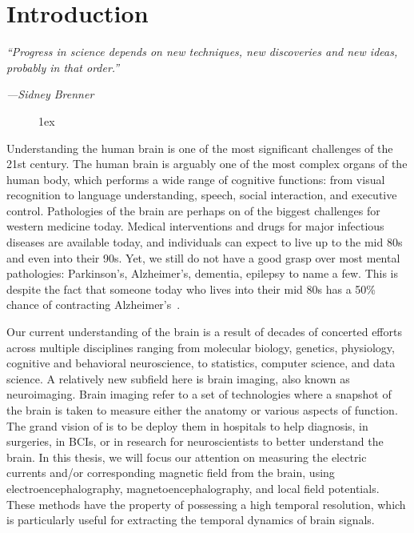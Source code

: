 \chapter{Introduction}
\label{chapter:intro}
\pagestyle{mainmatter}

\epigraph{\small\itshape ``Progress in science depends on new techniques, new discoveries and new ideas, probably in that order.''}{\small\textit{---Sidney Brenner}}

\begin{figure}[ht!]
\centering
\begingroup
\etocstandardlines
\renewcommand{\etocbelowtocskip}{0pt\relax}
\fboxsep1ex
\localtableofcontents
\endgroup
\end{figure}

\clearpage

Understanding the human brain is one of the most significant challenges of the 21st century. The human brain is arguably one of the most complex  organs of the human body, which performs a wide range of cognitive functions: from visual recognition to language understanding, speech, social interaction, and executive control. Pathologies of the brain are perhaps on of the biggest challenges for western medicine today. Medical interventions and drugs for major infectious diseases are available today, and individuals can expect to live up to the mid 80s and even into their 90s. Yet, we still do not have a good grasp over most mental pathologies: Parkinson's, Alzheimer's, dementia, epilepsy to name a few. This is despite the fact that someone today who lives into their mid 80s has a 50\% chance of contracting Alzheimer's~\citep{alzheimer20162016}.

Our current understanding of the brain is a result of decades of concerted efforts across multiple disciplines ranging from molecular biology, genetics, physiology, cognitive and behavioral neuroscience, to statistics, computer science, and data science. A relatively new subfield here is brain imaging, also known as neuroimaging. Brain imaging refer to a set of technologies where a snapshot of the brain is taken to measure either the anatomy or various aspects of function. The grand vision of is to be deploy them in hospitals to help diagnosis, in surgeries, in \acp{BCI}, or in research for neuroscientists to better understand the brain. 
In this thesis, we will focus our attention on measuring the electric currents and/or corresponding magnetic field from the brain, using electroencephalography, magnetoencephalography, and local field potentials. 
These methods have the property of possessing a high temporal resolution, which is particularly useful for extracting the temporal dynamics of brain signals.

